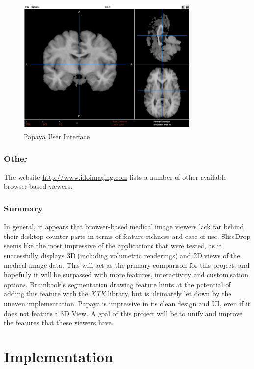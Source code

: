 \documentclass[a4paper,11pt,twoside]{article}
\begin{document}
\begin{figure}[ht!]
\centering
\includegraphics[width=90mm]{..//literatureSurvey/graphics/webViewer_02.png}
\caption{Papaya User Interface}
\label{fig:UIdesign1}
\end{figure}



\subsubsection{Other}

The website \url{http://www.idoimaging.com} lists a number of other available browser-based viewers.

\subsubsection{Summary}

In general, it appears that browser-based medical image viewers lack far behind their desktop counter parts in terms of feature richness and ease of use. SliceDrop seems like the most impressive of the applications that were tested, as it successfully displays 3D (including volumetric renderings) and 2D views of the medical image data. This will act as the primary comparison for this project, and hopefully it will be surpassed with more features, interactivity and customisation options. Brainbook's segmentation drawing feature hints at the potential of adding this feature with the \textit{XTK} library, but is ultimately let down by the uneven implementation. Papaya is impressive in its clean design and UI, even if it does not feature a 3D View. A goal of this project will be to unify and improve the features that these viewers have.




\newpage


\section{Implementation}
\end{document}
